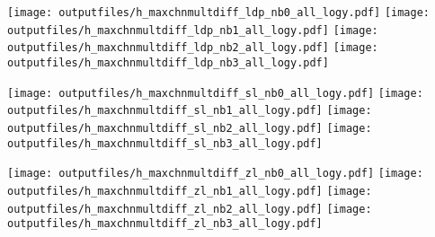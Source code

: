 \documentclass[11pt]{article}
\begin{document}
    \noindent
     \texttt{[image: outputfiles/h\_maxchnmultdiff\_ldp\_nb0\_all\_logy.pdf]}
     \texttt{[image: outputfiles/h\_maxchnmultdiff\_ldp\_nb1\_all\_logy.pdf]}
     \texttt{[image: outputfiles/h\_maxchnmultdiff\_ldp\_nb2\_all\_logy.pdf]}
     \texttt{[image: outputfiles/h\_maxchnmultdiff\_ldp\_nb3\_all\_logy.pdf]}

    \noindent
     \texttt{[image: outputfiles/h\_maxchnmultdiff\_sl\_nb0\_all\_logy.pdf]}
     \texttt{[image: outputfiles/h\_maxchnmultdiff\_sl\_nb1\_all\_logy.pdf]}
     \texttt{[image: outputfiles/h\_maxchnmultdiff\_sl\_nb2\_all\_logy.pdf]}
     \texttt{[image: outputfiles/h\_maxchnmultdiff\_sl\_nb3\_all\_logy.pdf]}

    \noindent
     \texttt{[image: outputfiles/h\_maxchnmultdiff\_zl\_nb0\_all\_logy.pdf]}
     \texttt{[image: outputfiles/h\_maxchnmultdiff\_zl\_nb1\_all\_logy.pdf]}
     \texttt{[image: outputfiles/h\_maxchnmultdiff\_zl\_nb2\_all\_logy.pdf]}
     \texttt{[image: outputfiles/h\_maxchnmultdiff\_zl\_nb3\_all\_logy.pdf]}

    \clearpage



  
\end{document}
